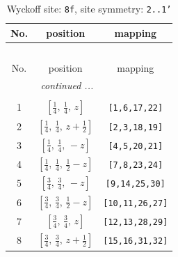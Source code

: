 \documentclass[fleqn,8pt]{jsarticle}
\begin{document}
\begin{longtable}{ccc}
\caption{Wyckoff site: {\tt 8f}, site symmetry: {\tt 2..1'}}
 \\
 \hline \hline
No. & position & mapping \\ \hline \endfirsthead

\multicolumn{2}{l}{\tablename\ \thetable{}} \\
 \hline \hline
No. & position & mapping \\ \hline \endhead

 \hline \hline
\multicolumn{2}{r}{\footnotesize\it continued ...} \\ \endfoot

 \hline \hline
\multicolumn{2}{r}{} \\ \endlastfoot

1 & $\left[ \frac{1}{4},\, \frac{1}{4},\, z \right]$ & {\tt [1,6,17,22]} \\ \hline
2 & $\left[ \frac{1}{4},\, \frac{1}{4},\, z + \frac{1}{2} \right]$ & {\tt [2,3,18,19]} \\ \hline
3 & $\left[ \frac{1}{4},\, \frac{1}{4},\, - z \right]$ & {\tt [4,5,20,21]} \\ \hline
4 & $\left[ \frac{1}{4},\, \frac{1}{4},\, \frac{1}{2} - z \right]$ & {\tt [7,8,23,24]} \\ \hline
5 & $\left[ \frac{3}{4},\, \frac{3}{4},\, - z \right]$ & {\tt [9,14,25,30]} \\ \hline
6 & $\left[ \frac{3}{4},\, \frac{3}{4},\, \frac{1}{2} - z \right]$ & {\tt [10,11,26,27]} \\ \hline
7 & $\left[ \frac{3}{4},\, \frac{3}{4},\, z \right]$ & {\tt [12,13,28,29]} \\ \hline
8 & $\left[ \frac{3}{4},\, \frac{3}{4},\, z + \frac{1}{2} \right]$ & {\tt [15,16,31,32]} \\
\end{longtable}
\renewcommand{\arraystretch}{1.2}
\end{document}
